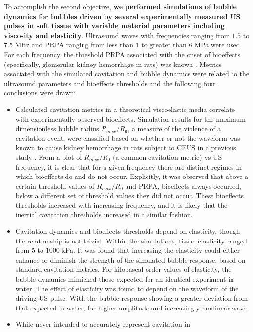   To accomplish the second objective, \textbf{we performed simulations
    of bubble dynamics for bubbles driven by several experimentally
    measured \ac{US} pulses in soft tissue with variable material
    parameters including viscosity and elasticity}. Ultrasound waves
  with frequencies ranging from $1.5$ to $7.5$ MHz and \acs{PRPA}
  ranging from less than $1$ to greater than $6$ MPa were used. For
  each frequency, the threshold \ac{PRPA} associated with the onset of
  bioeffects (specifically, glomerular kidney hemorrhage in rats) was
  known \citep{Miller2008b}. Metrics associated with the simulated
  cavitation and bubble dynamics were related to the ultrasound
  parameters and bioeffects thresholds and the following four conclusions
  were drawn:
\begin{itemize}
\item Calculated cavitation metrics in a theoretical viscoelastic
  media correlate with experimentally observed bioeffects. Simulation
  results for the maximum dimensionless bubble radius $R_{max}/R_0$, a
  measure of the violence of a cavitation event, were classified based
  on whether or not the waveform was known to cause kidney hemorrhage
  in rats subject to \ac{CEUS} in a previous study
  \citep{Miller2008b}. From a plot of $R_{max}/R_0$ (a common
  cavitation metric) vs \ac{US} frequency, it is clear that for a
  given frequency there are distinct regimes in which bioeffects do
  and do not occur. Explicitly, it was observed that above a certain
  threshold values of $R_{max}/R_0$ and \ac{PRPA}, bioeffects always
  occurred, below a different set of threshold values they did not
  occur. These bioeffects thresholds increased with increasing
  frequency, and it is likely that the inertial cavitation thresholds
  increased in a similar fashion.
\item Cavitation dynamics and bioeffects thresholds depend on
  elasticity, though the relationship is not trivial. Within the
  simulations, tissue elasticity ranged from $5$ to $1000$ kPa. It was
  found that increasing the elasticity could either enhance or
  diminish the strength of the simulated bubble response, based on
  standard cavitation metrics. For kilopascal order values of
  elasticity, the bubble dynamics mimicked those expected for an
  identical experiment in water. The effect of elasticity was
  found to depend on the waveform of the driving \ac{US} pulse. With
  the bubble response showing a greater deviation from that expected
  in water, for higher amplitude and increasingly nonlinear wave.
\item While never intended to accurately represent cavitation in

\end{itemize}
